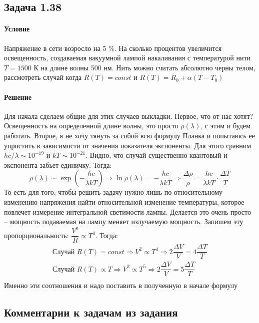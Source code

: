\documentclass[12pt]{article}
\begin{document}
\subsection{Задача 1.38}
\label{task_138}
\paragraph{Условие}
Напряжение в сети возросло на 5 \%. На сколько процентов увеличится освещенность, создаваемая вакуумной лампой накаливания с температурой нити $T = 1500$ К на длине волны 500 нм. Нить можно считать абсолютно черны телом, рассмотреть случай когда $R(T) = const$ и $R(T) = R_0 + \alpha (T - T_0)$
\paragraph{Решение}
Для начала сделаем общие для этих случаев выкладки. Первое, что от нас хотят? Освещенность на определенной длине волны, это просто $\rho(\lambda)$, с этим и будем работать. Второе, я не хочу тянуть за собой всю формулу Планка и попытаюсь ее упростить в зависимости от значения показателя экспоненты. Для этого сравним $hc/\lambda \sim 10^{-19}$ и $kT\sim10^{-21}$. Видно, что случай существенно квантовый и экспонента забьет единичку. Тогда:
\begin{equation*}
    \rho(\lambda) \sim \exp{\left(-\dfrac{hc}{\lambda kT} \right)} \Rightarrow \ln{\rho(\lambda)} = -\dfrac{hc}{\lambda kT} \Rightarrow \dfrac{\Delta \rho}{\rho} = \dfrac{hc}{\lambda kT} \cdot \dfrac{\Delta T}{T}
\end{equation*}
То есть для того, чтобы решить задачу нужно лишь по относительному изменению напряжения найти относительной изменение температуры, которое повлечет измерение интегральной светимости лампы. Делается это очень просто -- мощность подаваемая на лампу меняет излучаемую мощность. Запишем эту пропорциональность: $\dfrac{V^2}{R} \propto T^4$. Тогда:
\begin{gather*}
    \text{Случай } R(T) = const \Rightarrow V^2 \propto T^4 \Rightarrow 2\dfrac{\Delta V}{V} = 4\dfrac{\Delta T}{T}\\
    \text{Случай } R(T) \propto T \Rightarrow V^2 \propto T^5 \Rightarrow 2\dfrac{\Delta V}{V} = 5\dfrac{\Delta T}{T}\\
\end{gather*}
Именно эти соотношения и надо поставить в полученную в начале формулу
\subsection{Комментарии к задачам из задания}
\end{document}
